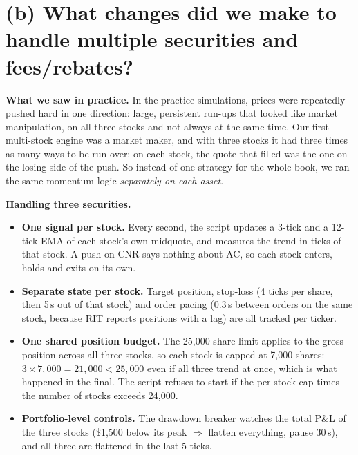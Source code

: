 \documentclass[11pt]{article}
\begin{document}
\section{(b) What changes did we make to handle multiple securities and fees/rebates?}

\textbf{What we saw in practice.} In the practice simulations, prices were
repeatedly pushed hard in one direction: large, persistent run-ups that looked like
market manipulation, on all three stocks and not always at the same time. Our first
multi-stock engine was a market maker, and with three stocks it had three times as
many ways to be run over: on each stock, the quote that filled was the one on the
losing side of the push. So instead of one strategy for the whole book, we ran the
same momentum logic \emph{separately on each asset}.

\textbf{Handling three securities.}
\begin{itemize}[leftmargin=1.4em, itemsep=0.2em]
  \item \textbf{One signal per stock.} Every second, the script updates a 3-tick and
        a 12-tick EMA of each stock's own midquote, and measures the trend in ticks
        of that stock. A push on CNR says nothing about AC, so each stock enters,
        holds and exits on its own.
  \item \textbf{Separate state per stock.} Target position, stop-loss (4 ticks per
        share, then 5\,s out of that stock) and order pacing (0.3\,s between orders
        on the same stock, because RIT reports positions with a lag) are all
        tracked per ticker.
  \item \textbf{One shared position budget.} The 25,000-share limit applies to the
        gross position across all three stocks, so each stock is capped at 7,000
        shares: $3 \times 7{,}000 = 21{,}000 < 25{,}000$ even if all three trend at
        once, which is what happened in the final. The script refuses to start if
        the per-stock cap times the number of stocks exceeds 24,000.
  \item \textbf{Portfolio-level controls.} The drawdown breaker watches the total
        P\&L of the three stocks (\$1,500 below its peak $\Rightarrow$ flatten
        everything, pause 30\,s), and all three are flattened in the last 5 ticks.
\end{itemize}
\end{document}
